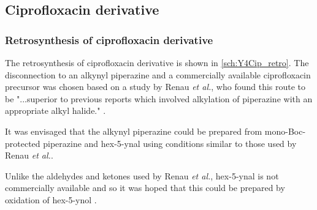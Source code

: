 

\subsection{Ciprofloxacin derivative}




\subsubsection{Retrosynthesis of ciprofloxacin derivative }

The retrosynthesis of ciprofloxacin derivative  is shown in \ref{sch:Y4Cip_retro}. The disconnection to an alkynyl piperazine  and a commercially available ciprofloxacin precursor  was chosen based on a study by Renau \textit{et al.}, who found this route to be "...superior to previous reports which involved alkylation of piperazine with an appropriate alkyl halide." \cite{Renau1996,JPS:JPS2600571210}. 

It was envisaged that the alkynyl piperazine  could be prepared from mono-Boc-protected piperazine  and hex-5-ynal  using conditions similar to those used by Renau \textit{et al.}\cite{Renau1996}.

Unlike the aldehydes and ketones used by Renau \textit{et al.}\cite{Renau1996}, hex-5-ynal  is not commercially available and so it was hoped that this could be prepared by oxidation of hex-5-ynol .

